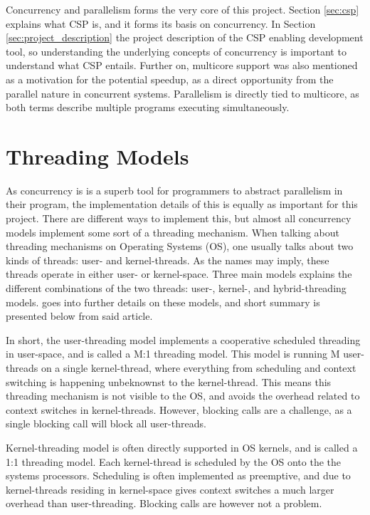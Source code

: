 Concurrency and parallelism forms the very core of this project. Section \ref{sec:csp} explains what CSP is, and it forms its basis on concurrency. In Section \ref{sec:project_description} the project description of the CSP enabling development tool, so understanding the underlying concepts of concurrency is important to understand what CSP entails. Further on, multicore support was also mentioned as a motivation for the potential speedup, as a direct opportunity from the parallel nature in concurrent systems. Parallelism is directly tied to multicore, as both terms describe multiple programs executing simultaneously. 


\section{Threading Models}
\label{sec:threading_models}

As concurrency is is a superb tool for programmers to abstract parallelism in their program, the implementation details of this is equally as important for this project. There are different ways to implement this, but almost all concurrency models implement some sort of a threading mechanism. When talking about threading mechanisms on Operating Systems (OS), one usually talks about two kinds of threads: user- and kernel-threads. As the names may imply, these threads operate in either user- or kernel-space. Three main models explains the different combinations of the two threads: user-, kernel-, and hybrid-threading models. \citet{c++csp2} goes into further details on these models, and short summary is presented below from said article.

In short, the user-threading model implements a cooperative scheduled threading in user-space, and is called a M:1 threading model. This model is running M user-threads on a single kernel-thread, where everything from scheduling and context switching is happening unbeknownst to the kernel-thread. This means this threading mechanism is not visible to the OS, and avoids the overhead related to context switches in kernel-threads. However, blocking calls are a challenge, as a single blocking call will block all user-threads.

Kernel-threading model is often directly supported in OS kernels, and is called a 1:1 threading model. Each kernel-thread is scheduled by the OS onto the the systems processors. Scheduling is often implemented as preemptive, and due to kernel-threads residing in kernel-space gives context switches a much larger overhead than user-threading. Blocking calls are however not a problem. 

